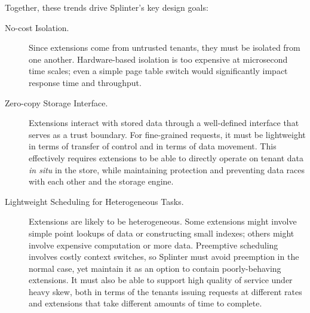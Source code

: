 Together, these trends drive Splinter's key design goals:
\begin{description}
\item[No-cost Isolation.]
  Since extensions come from untrusted tenants, they must be isolated from one
    another.
  Hardware-based isolation is too
    expensive at microsecond time scales; even a simple page table switch would
    significantly impact response time and throughput.

\item[Zero-copy Storage Interface.]
  Extensions interact with stored data through a well-defined interface that
    serves as a trust boundary.
  For fine-grained requests, it
    must be lightweight in terms of transfer of control and in terms of
    data movement.
  This effectively requires extensions to be able to directly operate on tenant
    data \textit{in situ} in the store, while maintaining protection and
    preventing data races with each other and the storage engine.

\item[Lightweight Scheduling for Heterogeneous Tasks.]
  Extensions are likely to be heterogeneous.
  Some extensions might involve simple point lookups of data or constructing
    small indexes; others might involve expensive computation or more data.
  Preemptive scheduling involves costly context switches, so Splinter
    must avoid preemption in the normal case, yet maintain it as an option
    to contain poorly-behaving extensions.
  It must also be able to support high quality of service under heavy skew, 
    both in terms of the tenants issuing requests at different rates and
    extensions that take different amounts of time to complete.


\end{description}
